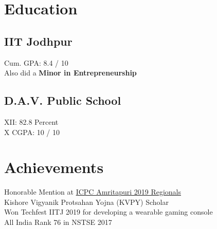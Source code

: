 \documentclass[]{deedy-resume-openfont}
\begin{document}
%
%
\lastupdated

%
%

%
%

\begin{minipage}[t]{0.33\textwidth} 


\section{Education} 

\subsection{IIT Jodhpur}
Cum. GPA: 8.4 / 10\\
Also did a \textbf{Minor in Entrepreneurship}



\sectionsep

\subsection{D.A.V. Public School}
 XII:  82.8 Percent \\
X  CGPA: 10 / 10 

\sectionsep
\section{Achievements} 
\textbullet{} Honorable Mention at \href{https://icpc.global/ICPCID/SV747893JYP7}{ICPC Amritapuri 2019 Regionals \small{\faExternalLink}}\\
\textbullet{} Kishore Vigyanik Protsahan Yojna (KVPY) Scholar\\
\textbullet{} Won Techfest IITJ 2019 for developing a wearable gaming console\\
\textbullet{} All India Rank 76 in NSTSE 2017


\end{minipage}
\end{document}
